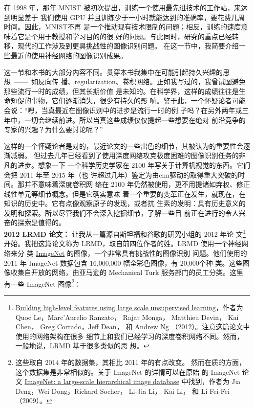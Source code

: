 在 1998 年，那年 MNIST 被初次提出，训练一个使用最先进技术的工作站，来达到明显差于
我们使用 GPU 并且训练少于一小时就能达到的准确率，要花费几周时间。因此，MNIST不再
是一个推动现有技术限制的问题；相反，训练的速度意味着它是个用于教授和学习目的的很
好的问题。与此同时，研究的重点已经转移，现代的工作涉及到更具挑战性的图像识别问题。
在这一节中，我简要介绍一些最近的使用神经网络的图像识别成果。

这一节和本书的大部分内容不同。贯穿本书我集中在可能引起持久兴趣的思想~——~如反向传
播、\gls*{regularization}、卷积网络。正如我写过的，我曾试图避免那些流行一时的成绩，但其长期价值
是未知的。在科学界，这样的成绩往往是生命短促的事物，它们逐渐消失，很少有持久的影
响。鉴于此，一个怀疑论者可能会说：“嗯，当真最近在图像识别中的进步是流行一时的例
子吗？在另外两年或三年中，一切会继续前进。所以当真这些成绩仅仅提起一些想要在绝对
前沿竞争的专家的兴趣？为什么要讨论呢？”

这样的一个怀疑论者是对的，最近论文的一些出色的细节，其被认为的重要性会逐渐减弱。
但过去几年已经看到了使用深度网络攻克极度困难的图像识别任务的非凡的进步。想象一下
一个科学历史学家在 2100 年写关于计算机视觉的东西。它们会把 2011 年至 2015 年（也
许超过几年）鉴定为由\gls*{cnn}驱动的取得重大突破的时间。那并不意味着深度卷积网
络在 2100 年仍然被使用，更不用提诸如弃权、修正线性单元等细节概念。但是它确实意味
着一个重要的变革正在发生，就现在，在知识的历史中。它有点像观察原子的发现，或者抗
生素的发明：具有历史意义的发明和探索。所以尽管我们不会深入挖掘细节，了解一些目
前正在进行的令人兴奋的探索是值得的。\\

\textbf{2012 LRMD 论文：} 让我从一篇源自斯坦福和谷歌的研究小组的 2012 年论
文\footnote{\href{http://research.google.com/pubs/pub38115.html}{Building
    high-level features using large scale unsupervised learning}，作者为 Quoc
  Le，Marc'Aurelio Ranzato， Rajat Monga， Matthieu Devin， Kai Chen， Greg
  Corrado，Jeff Dean， 和 Andrew Ng （2012）。注意这篇论文中使用的网络架构在很多
  细节上和我们已经学习的深度卷积网络不同。然而，一般地说，LRMD 基于很多类似的思
  想。}开始。我把这篇论文称为 LRMD，取自前四位作者的姓。LRMD 使用一个神经网络来分
类 \href{http://www.image-net.org/}{ImageNet} 的图像，一个非常具有挑战性的图像识别
问题。他们使用的 2011 年 ImageNet 数据包含 16,000,000 幅全彩色图像，有 20,000个种
类。这些图像收集自开放的网络，由亚马逊的 Mechanical Turk 服务部门的员工分类。这里
有一些 ImageNet 图像\footnote{这些取自 2014 年的数据集，其相比 2011 年的有点改变。
  然而在质的方面，这个数据集是非常相似的。关于 ImageNet 的详情可以在原始
  的 ImageNet 论文 \href{http://www.image-net.org/papers/imagenet_cvpr09.pdf}{
    ImageNet: a large-scale hierarchical image database} 中找到，作者为 Jia
  Deng，Wei Dong，Richard Socher， Li-Jia Li， Kai Li， 和 Li
  Fei-Fei （2009）。}：

